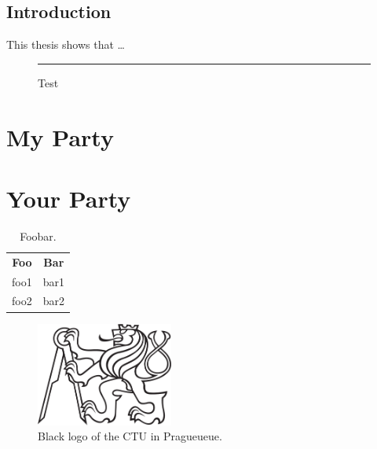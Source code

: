 \documentclass[twoside]{ctuthesis}
\theoremstyle{plain}
\theoremstyle{definition}
\theoremstyle{note}
\begin{document}
\maketitle

\chapter{Introduction}

This thesis shows that \ldots

\begin{figure}[!h]
\rule{3cm}{3cm}
\caption{Test}
\end{figure}

\part{My Party}






\part{Your Party}

\blindmathtrue

\blinddocument

\begin{table}
\begin{ctucolortab}
\begin{tabular}{cc}
\bfseries Foo & \bfseries Bar \\\Midrule
foo1 & bar1 \\
foo2 & bar2
\end{tabular}
\end{ctucolortab}
\caption{Foobar.}
\label{tab:foobar}
\end{table}

\begin{figure}
\includegraphics[width=0.4\textwidth]{ctu_logo_black}
\caption{Black logo of the CTU in Pragueueue.}
\end{figure}
\end{document}
